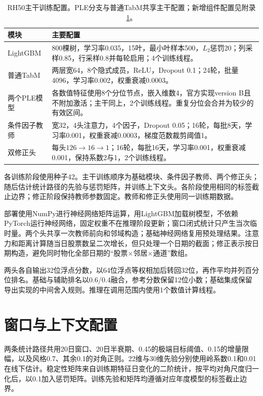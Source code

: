 \documentclass[UTF8,11pt,a4paper,fontset=fandol]{ctexart}
\begin{document}
\begin{table}[htbp]\centering\small
\caption{RH50主干训练配置。PLE分支与普通TabM共享主干配置；新增组件配置见附录\ref{app:windowconfig}。}\label{tab:config}
\begin{tabularx}{\linewidth}{p{2.5cm}X}\toprule
模块 & 主要配置\\\midrule
LightGBM & 800棵树，学习率0.035，15叶，最小叶样本500，$L_2$惩罚20；列采样0.85，行采样0.8并每轮启用；4个训练线程。\\
普通TabM & 两层宽64，8个隐式成员，ReLU，Dropout 0.1；24轮，批量4096，学习率0.002，权重衰减0.0003。\\
两个PLE模型 & 各数值特征使用8个分位节点，嵌入维数4，官方实现version B且不附加激活；主干同上，2个训练线程。重复分位会合并为较少的有效区间。\\
条件因子教师 & 宽32，4头注意力，4个因子，Dropout 0.05；16轮，每批8天，学习率0.001，权重衰减0.0003，梯度范数裁剪阈值1。\\
双修正头 & 每头$126\to16\to1$；16轮，每批16天，学习率0.001，权重衰减0.001，保持系数2与1，2个训练线程。\\\bottomrule
\end{tabularx}
\end{table}

各训练阶段使用种子42。主干训练顺序为基础模块、条件因子教师、两个修正头；随后估计统计路径的先验与惩罚矩阵，并训练上下文头。各阶段使用相同的标签截止边界；修正阶段保持教师参数固定。教师和修正头使用同一训练期数据。

部署使用NumPy进行神经网络矩阵运算，用LightGBM加载树模型，不依赖PyTorch运行神经网络，固定权重不在推理阶段更新；窗口闭式统计只产生当次临时量。两个头共享一次教师前向和邻域构造；基础神经网络复用预处理结果。注意力和距离计算随当日股票数呈二次增长，但只处理一个日期的截面；修正表示按日期构造，避免同时物化全部日期的“股票$\times$邻居$\times$通道”数组。

两头各自输出32位浮点分数，以64位浮点等权相加后转回32位，再作平均并列百分位排名。基础与辅助排名以0.6/0.4融合，参考分数保留12位小数；基础集成保留导出实现的中间舍入规则。推理在调用范围内使用1个数值计算线程。


\section{窗口与上下文配置}\label{app:windowconfig}
两条统计路径共用20日窗口、20日半衰期、0.45的极端目标阈值、0.15的增量限幅，以及风格0.7、其余0.1的对角正则。22维与30维先验分别使用岭系数0.1和0.01在线下估计。稳定性矩阵来自训练期特征日变化的二阶统计，按平均对角尺度归一化后，以0.1加入惩罚矩阵。训练先验和矩阵均遵循对应年度模型的标签截止边界。
\end{document}
